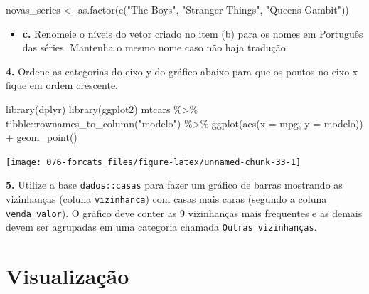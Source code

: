 \documentclass[
]{book}
\newenvironment{Shaded}{\begin{snugshade}}{\end{snugshade}}
\newcommand{\AttributeTok}[1]{\textcolor[rgb]{0.77,0.63,0.00}{#1}}
\newcommand{\FunctionTok}[1]{\textcolor[rgb]{0.00,0.00,0.00}{#1}}
\newcommand{\NormalTok}[1]{#1}
\newcommand{\OtherTok}[1]{\textcolor[rgb]{0.56,0.35,0.01}{#1}}
\newcommand{\SpecialCharTok}[1]{\textcolor[rgb]{0.00,0.00,0.00}{#1}}
\newcommand{\StringTok}[1]{\textcolor[rgb]{0.31,0.60,0.02}{#1}}
\providecommand{\tightlist}{%
  \setlength{\itemsep}{0pt}\setlength{\parskip}{0pt}}
\begin{document}
\begin{Shaded}
\begin{Highlighting}[]
\NormalTok{novas\_series }\OtherTok{\textless{}{-}} \FunctionTok{as.factor}\NormalTok{(}\FunctionTok{c}\NormalTok{(}\StringTok{"The Boys"}\NormalTok{, }\StringTok{"Stranger Things"}\NormalTok{, }\StringTok{"Queen\textquotesingle{}s Gambit"}\NormalTok{))}
\end{Highlighting}
\end{Shaded}

\begin{itemize}
\tightlist
\item
  \textbf{c.} Renomeie o níveis do vetor criado no item (b) para os nomes em Português das séries. Mantenha o mesmo nome caso não haja tradução.
\end{itemize}

\textbf{4.} Ordene as categorias do eixo y do gráfico abaixo para que os pontos no eixo x fique em ordem crescente.

\begin{Shaded}
\begin{Highlighting}[]
\FunctionTok{library}\NormalTok{(dplyr)}
\FunctionTok{library}\NormalTok{(ggplot2)}
\NormalTok{mtcars }\SpecialCharTok{\%\textgreater{}\%} 
\NormalTok{  tibble}\SpecialCharTok{::}\FunctionTok{rownames\_to\_column}\NormalTok{(}\StringTok{"modelo"}\NormalTok{) }\SpecialCharTok{\%\textgreater{}\%} 
  \FunctionTok{ggplot}\NormalTok{(}\FunctionTok{aes}\NormalTok{(}\AttributeTok{x =}\NormalTok{ mpg, }\AttributeTok{y =}\NormalTok{ modelo)) }\SpecialCharTok{+}
  \FunctionTok{geom\_point}\NormalTok{()}
\end{Highlighting}
\end{Shaded}

\begin{center}\texttt{[image: 076-forcats\_files/figure-latex/unnamed-chunk-33-1]} \end{center}

\textbf{5.} Utilize a base \texttt{dados::casas} para fazer um gráfico de barras mostrando as vizinhanças (coluna \texttt{vizinhanca}) com casas mais caras (segundo a coluna \texttt{venda\_valor}). O gráfico deve conter as 9 vizinhanças mais frequentes e as demais devem ser agrupadas em uma categoria chamada \texttt{Outras\ vizinhanças}.

\hypertarget{graficos}{%
\chapter{Visualização}\label{graficos}}
\end{document}
